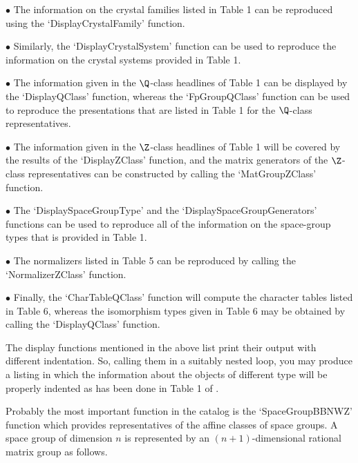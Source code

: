 \beginlist%
\item{$\bullet$} 
    The information on the crystal families listed in Table 1 can
    be reproduced using the `DisplayCrystalFamily' function.
\item{$\bullet$} 
    Similarly, the `DisplayCrystalSystem' function can be
    used to reproduce the information on the crystal systems
    provided in Table 1.
\item{$\bullet$} 
    The information given in the $\Q$-class headlines of
    Table 1 can be displayed by the `DisplayQClass' function,
    whereas the `FpGroupQClass' function can be used to reproduce
    the presentations that are listed in Table 1 for the $\Q$-class
    representatives.
\item{$\bullet$} 
    The information given in the $\Z$-class headlines of Table 1
    will be covered by the results of the `DisplayZClass' function,
    and the matrix generators of the $\Z$-class representatives can
    be constructed by calling the `MatGroupZClass' function.
\item{$\bullet$} 
    The `DisplaySpaceGroupType' and the
    `DisplaySpaceGroupGenerators' functions can be used to
    reproduce all of the information on the space-group types that
    is provided in Table 1.
\item{$\bullet$} 
    The normalizers listed in Table 5 can be reproduced by
    calling the `NormalizerZClass' function.
\item{$\bullet$} 
    Finally, the `CharTableQClass' function will compute the
    character tables listed in Table 6, whereas the isomorphism
    types given in Table 6 may be obtained by calling the
    `DisplayQClass' function.  
\endlist

The display functions mentioned in the above list print their output
with different indentation.  So, calling them in a suitably nested
loop, you may produce a listing in which the information about the
objects of different type will be properly indented as has been done
in Table 1 of \cite{BBNWZ78}.


Probably the most important function in the catalog is the
`SpaceGroupBBNWZ' function which provides representatives of the
affine classes of space groups.  A space group of dimension $n$ is
represented by an $(n+1)$-dimensional rational matrix group as
follows.

